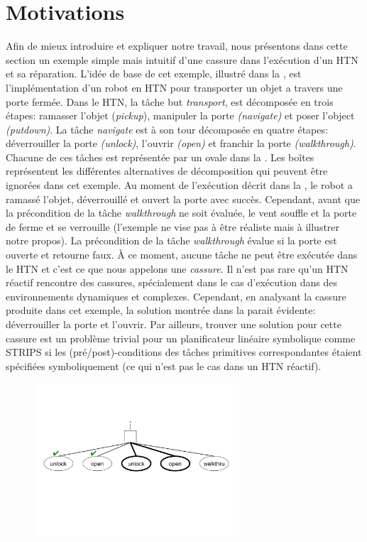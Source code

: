 \documentclass[a4paper,twoside,french]{article}
\begin{document}
		\section{Motivations}
		\label{sec:motivation}
		Afin de mieux introduire et expliquer notre travail, nous présentons dans cette section un exemple simple mais intuitif d'une cassure dans l'exécution d'un HTN et sa réparation. L'idée de base de cet exemple, illustré dans la  , est l'implémentation d'un robot en HTN pour transporter un objet a travers une porte fermée. Dans le HTN, la tâche but {\em transport}, est décomposée en trois étapes: ramasser l'objet ({\em pickup}), manipuler la porte {\em(navigate)} et poser l'object {\em(putdown)}. La tâche {\em navigate} est à son tour décomposée en quatre étapes: déverrouiller  la porte {\em(unlock)}, l'ouvrir {\em(open)} et franchir la porte {\em(walkthrough)}. Chacune de ces tâches est représentée par un ovale dans la . Les boîtes représentent les différentes alternatives de décomposition qui peuvent être ignorées dans cet exemple. Au moment de l'exécution décrit dans la , le robot a ramassé l'objet, déverrouillé et ouvert la porte avec succès. Cependant, avant que la précondition de la tâche {\em walkthrough} ne soit évaluée, le vent souffle et la porte de ferme et se verrouille (l'exemple ne vise pas à être réaliste mais à illustrer notre propos). La précondition de la tâche {\em walkthrough} évalue si la porte est ouverte et retourne faux. À ce moment, aucune tâche ne peut être exécutée dans le HTN et c'est ce que nous appelons une {\em cassure}. Il n'est pas rare qu'un HTN réactif rencontre des cassures, spécialement dans le cas d'exécution dans des environnements dynamiques et complexes. Cependant, en analysant la cassure produite dans cet exemple, la solution montrée dans la  parait évidente: déverrouiller la porte et l'ouvrir. Par ailleurs, trouver une solution pour cette cassure est un problème trivial pour un planificateur linéaire symbolique comme STRIPS si les (pré/post)-conditions des tâches primitives correspondantes étaient spécifiées symboliquement (ce qui n'est pas le cas dans un HTN réactif).
					\begin{figure}[t]
						\centerline{\includegraphics[width=3in]{figs/recover}}
						\vskip 8pt
					\end{figure}
		
\end{document}
